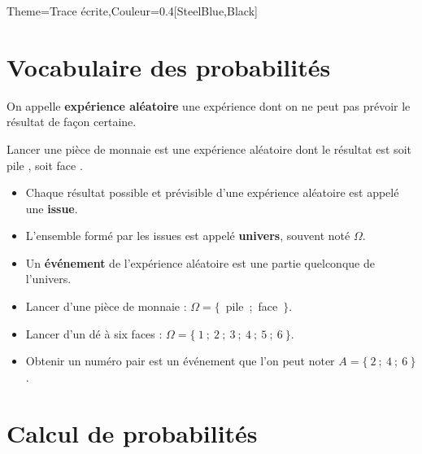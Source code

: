 \begin{Maquette}[Cours]{Theme={Trace écrite},Couleur={0.4[SteelBlue,Black]}}

   \section{Vocabulaire des probabilités}

      \begin{definition*}{}
         On appelle \textbf{expérience aléatoire} une expérience dont on ne peut pas prévoir le résultat de façon certaine.
      \end{definition*}

      \begin{exemple*}{}
         Lancer une pièce de monnaie est une expérience aléatoire dont le résultat est soit \og pile \fg, soit \og face \fg.
      \end{exemple*}

      \begin{definition*}{}
         \begin{itemize}
            \item Chaque résultat possible et prévisible d'une expérience aléatoire est appelé une \textbf{issue}.
            \item L'ensemble formé par les issues est appelé \textbf{univers}, souvent noté $\Omega$.
            \item Un \textbf{événement} de l'expérience aléatoire est une partie quelconque de l'univers.
         \end{itemize}
      \end{definition*}

      \begin{exemple*}{}
         \begin{itemize}
            \item Lancer d'une pièce de monnaie : $\Omega =\{$~pile~;~face~$\}$.
            \item Lancer d'un dé à six faces : $\Omega =\{~1~;~2~;~3~;~4~;~5~;~6~\}$.
            \item \og Obtenir un numéro pair \fg{} est un événement que l'on peut noter $A=\{~2~;~4~;~6~\}$.
         \end{itemize}
      \end{exemple*}


   \section{Calcul de probabilités} %


\end{Maquette}
